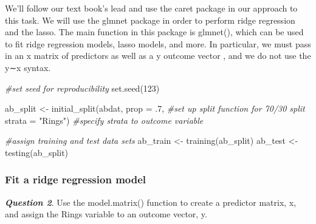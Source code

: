 \documentclass[
]{article}
\newenvironment{Shaded}{\begin{snugshade}}{\end{snugshade}}
\newcommand{\AttributeTok}[1]{\textcolor[rgb]{0.77,0.63,0.00}{#1}}
\newcommand{\CommentTok}[1]{\textcolor[rgb]{0.56,0.35,0.01}{\textit{#1}}}
\newcommand{\DecValTok}[1]{\textcolor[rgb]{0.00,0.00,0.81}{#1}}
\newcommand{\FunctionTok}[1]{\textcolor[rgb]{0.00,0.00,0.00}{#1}}
\newcommand{\NormalTok}[1]{#1}
\newcommand{\OtherTok}[1]{\textcolor[rgb]{0.56,0.35,0.01}{#1}}
\newcommand{\SpecialCharTok}[1]{\textcolor[rgb]{0.00,0.00,0.00}{#1}}
\newcommand{\StringTok}[1]{\textcolor[rgb]{0.31,0.60,0.02}{#1}}
\begin{document}
We'll follow our text book's lead and use the caret package in our
approach to this task. We will use the glmnet package in order to
perform ridge regression and the lasso. The main function in this
package is glmnet(), which can be used to fit ridge regression models,
lasso models, and more. In particular, we must pass in an x matrix of
predictors as well as a y outcome vector , and we do not use the y∼x
syntax.

\begin{Shaded}
\begin{Highlighting}[]
\CommentTok{\#set seed for reproducibility}
\FunctionTok{set.seed}\NormalTok{(}\DecValTok{123}\NormalTok{)}

\NormalTok{ab\_split }\OtherTok{\textless{}{-}} \FunctionTok{initial\_split}\NormalTok{(abdat, }\AttributeTok{prop =}\NormalTok{ .}\DecValTok{7}\NormalTok{, }\CommentTok{\#set up split function for 70/30 split}
                          \AttributeTok{strata =} \StringTok{"Rings"}\NormalTok{) }\CommentTok{\#specify strata to outcome variable}

\CommentTok{\#assign training and test data sets}
\NormalTok{ab\_train }\OtherTok{\textless{}{-}} \FunctionTok{training}\NormalTok{(ab\_split)}
\NormalTok{ab\_test }\OtherTok{\textless{}{-}} \FunctionTok{testing}\NormalTok{(ab\_split)}
\end{Highlighting}
\end{Shaded}

\hypertarget{fit-a-ridge-regression-model}{%
\subsubsection{Fit a ridge regression
model}\label{fit-a-ridge-regression-model}}

\textbf{\emph{Question 2}}. Use the model.matrix() function to create a
predictor matrix, x, and assign the Rings variable to an outcome vector,
y.

\begin{Shaded}
\end{Shaded}
\end{document}
